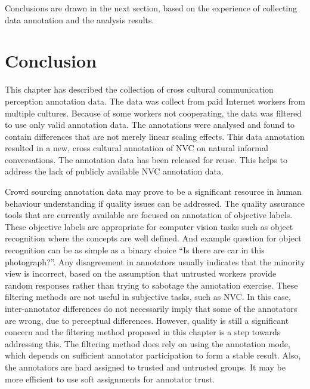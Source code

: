 



Conclusions are drawn in the next section, based on the experience of collecting data annotation and the analysis results.

\section{Conclusion}


This chapter has described the collection of cross cultural communication perception annotation data. The data was collect from paid Internet workers from multiple cultures. Because of some workers not cooperating, the data was filtered to use only valid annotation data. The annotations were analysed and found to contain differences that are not merely linear scaling effects. This data annotation resulted in a new, cross cultural annotation of \ac{NVC} on natural informal conversations. The annotation data has been released for reuse. This helps to address the lack of publicly available \ac{NVC} annotation data. 

Crowd sourcing annotation data may prove to be a significant resource in human behaviour understanding if quality issues can be addressed. The quality assurance tools that are currently available are focused on annotation of objective labels. These objective labels are appropriate for computer vision tasks such as object recognition where the concepts are well defined. And example question for object recognition can be as simple as a binary choice ``Is there are car in this photograph?''. Any disagreement in annotators usually indicates that the minority view is incorrect, based on the assumption that untrusted workers provide random responses rather than trying to sabotage the annotation exercise. These filtering methods are not useful in subjective tasks, such as \ac{NVC}. In this case, inter-annotator differences do not necessarily imply that some of the annotators are wrong, due to perceptual differences. However, quality is still a significant concern and the filtering method proposed in this chapter is a step towards addressing this. The filtering method does rely on using the annotation mode, which depends on sufficient annotator participation to form a stable result. Also, the annotators are hard assigned to trusted and untrusted groups. It may be more efficient to use soft assignments for annotator trust.

